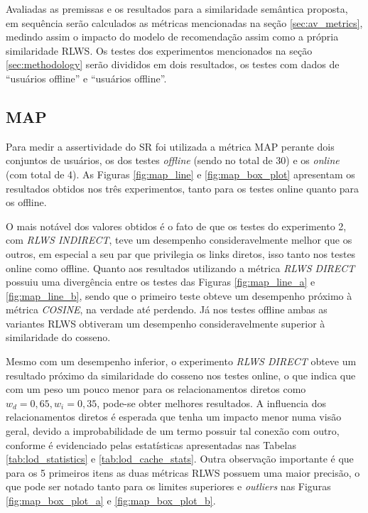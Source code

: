 Avaliadas as premissas e os resultados para a similaridade semântica proposta, em sequência serão calculados as métricas mencionadas na seção \ref{sec:av_metrics}, medindo assim o impacto do modelo de recomendação assim como a própria similaridade \ac{RLWS}. Os testes dos experimentos mencionados na seção \ref{sec:methodology} serão divididos em dois resultados, os testes com dados de \enquote{usuários offline} e \enquote{usuários offline}.

\subsection{MAP}

Para medir a assertividade do \ac{SR} foi utilizada a métrica \ac{MAP} perante dois conjuntos de usuários, os dos testes \textit{offline} (sendo no total de 30) e os \textit{online} (com total de 4). As Figuras \ref{fig:map_line} e \ref{fig:map_box_plot} apresentam os resultados obtidos nos três experimentos, tanto para os testes online quanto para os offline. 

O mais notável dos valores obtidos é o fato de que os testes do experimento 2, com \textit{RLWS INDIRECT}, teve um desempenho consideravelmente melhor que os outros, em especial a seu par que privilegia os links diretos, isso tanto nos testes online como offline. Quanto aos resultados utilizando a métrica \textit{RLWS DIRECT} possuiu uma divergência entre os testes das Figuras \ref{fig:map_line_a} e \ref{fig:map_line_b}, sendo que o primeiro teste obteve um desempenho próximo à métrica \textit{COSINE}, na verdade até perdendo. Já nos testes offline ambas as variantes \ac{RLWS} obtiveram um desempenho consideravelmente superior à similaridade do cosseno.

Mesmo com um desempenho inferior, o experimento \textit{RLWS DIRECT} obteve um resultado próximo da similaridade do cosseno nos testes online, o que indica que com um peso um pouco menor para os relacionamentos diretos como $w_d = 0,65, w_i = 0,35$, pode-se obter melhores resultados. A influencia dos relacionamentos diretos é esperada que tenha um impacto menor numa visão geral, devido a improbabilidade de um termo possuir tal conexão com outro, conforme é evidenciado pelas estatísticas apresentadas nas Tabelas \ref{tab:lod_statistics} e \ref{tab:lod_cache_stats}. Outra observação importante é que para os 5 primeiros itens as duas métricas \ac{RLWS} possuem uma maior precisão, o que pode ser notado tanto para os limites superiores e \textit{outliers} nas Figuras \ref{fig:map_box_plot_a} e \ref{fig:map_box_plot_b}.

